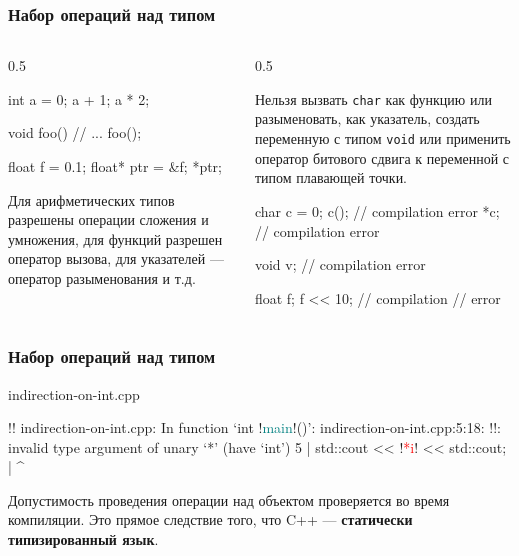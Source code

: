 \documentclass[compress, 8pt, aspectratio=169]{beamer}
\begin{document}
\begin{frame}[fragile]

    \frametitle{Набор операций над типом}

    \begin{columns}[T]

        \begin{column}{0.5\textwidth}

            \begin{myinplacelisting}[minted language=cpp]
int a = 0;
a + 1;
a * 2;

void foo() {}
// ...
foo();

float f = 0.1;
float* ptr = &f;
*ptr;
            \end{myinplacelisting}

            Для арифметических типов разрешены операции сложения
            и умножения, для функций разрешен оператор вызова,
            для указателей --- оператор разыменования и т.д.

        \end{column}

        \begin{column}{0.5\textwidth}

            Нельзя вызвать \verb|char| как функцию или разыменовать, как
            указатель, создать переменную с типом \verb|void| или
            применить оператор битового сдвига к переменной с типом
            плавающей точки.

            \begin{myinplacelisting}[minted language=cpp]
char c = 0;
c(); // compilation error
*c;  // compilation error

void v; // compilation error

float f;
f << 10; // compilation
         // error
            \end{myinplacelisting}

        \end{column}

    \end{columns}

\end{frame}

\begin{frame}[fragile]

    \frametitle{Набор операций над типом}

        {indirection-on-int.cpp}

    \begin{terminalwindow}
!!
indirection-on-int.cpp: In function ‘int !\textcolor{teal}{main}!()’:
indirection-on-int.cpp:5:18: !\color{red}{error}!: invalid type argument of unary ‘*’ (have ‘int’)
    5 |     std::cout << !\textcolor{red}{*i}! << std::cout;
      |                  ^~
    \end{terminalwindow}

    Допустимость проведения операции над объектом проверяется во время
    компиляции. Это прямое следствие того, что C++ ---
    \textbf{статически типизированный язык}.

\end{frame}
\end{document}
